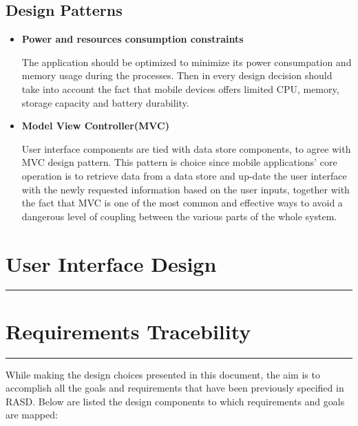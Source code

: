 \documentclass[12pt]{article}
\begin{document}
\newpage
\subsection{Design Patterns}
\vspace{5mm}
\begin{itemize}
\item \textbf{Power and resources consumption constraints}

The application should be optimized to minimize its power consumpation and memory usage during the processes. Then in every design decision should take into account the fact that mobile devices offers limited CPU, memory, storage capacity and battery durability.

\item \textbf{Model View Controller(MVC)}

User interface components are tied with data store components, to agree with MVC design pattern. This pattern is choice since mobile applications' core operation is to retrieve data from a data store and up-date the user interface with the newly requested information based on the user inputs, together with the fact that MVC is one of the most common and effective ways to avoid a dangerous level of coupling between the various parts of the whole system.


\end{itemize}
\newpage
\section{User Interface Design}
\hrule
\vspace{5mm}
\newpage

\newpage
\section{Requirements Tracebility}
\hrule
\vspace{5mm}
While making the design choices presented in this document, the aim is to accomplish all the goals and requirements that have been previously specified in RASD. Below are listed the design components to which requirements and goals are mapped: 
\end{document}

